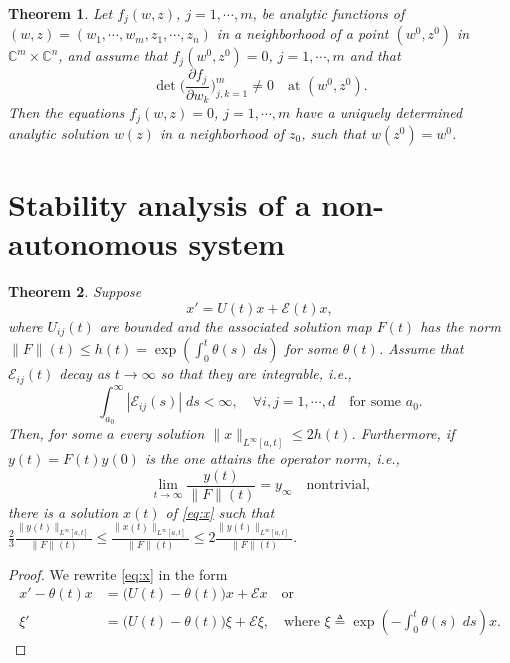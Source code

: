 \documentclass[a4paper,11pt]{article}
\newtheorem{theorem}{Theorem}
\theoremstyle{remark}
\begin{document}
{\begin{theorem}{\cite[p. 24]{L1966}} \label{thm:anal} Let $f_j(w,z)$, $j=1,\cdots,m$, be analytic functions of $(w,z)=(w_1,\cdots,w_m,z_1,\cdots,z_n)$ in a neighborhood of a point $(w^0,z^0)$ in $\mathbb{C}^m\times \mathbb{C}^n$, and assume that $f_j(w^0,z^0)=0$, $j=1,\cdots,m$ and that
$$ \det\Big( \frac{\partial f_j}{\partial w_k} \Big)_{j,k=1}^m \ne 0 \quad \text{at $(w^0,z^0)$}.$$
Then the equations $f_j(w,z)=0$, $j=1,\cdots,m$ have a uniquely determined analytic solution $w(z)$ in a neighborhood of $z_0$, such that $w(z^0)=w^0$.
\end{theorem}



\section{Stability analysis of a non-autonomous system}
\begin{theorem} \label{prop:stab}
 Suppose
 \begin{equation}
x' = U(t)x + \mathcal{E}(t)x, \label{eq:x}
 \end{equation}
where $U_{ij}(t)$ are bounded and the associated solution map $F(t)$ has the norm $\|F\|(t) \le h(t)=\exp\left(\int_0^t \theta(s)\; ds\right)$ for some $\theta(t)$. Assume that $\mathcal{E}_{ij}(t)$ decay as $t \rightarrow \infty$ so that they are integrable, i.e.,
 $$ \int_{a_0}^\infty |\mathcal{E}_{ij}(s)| \; ds < \infty, \quad \forall i,j=1,\cdots,d \quad \text{for some $a_0$.}$$
 Then, for some $a$ every solution $\|x\|_{L^\infty[a,t]} \le 2h(t)$. Furthermore, if $y(t)=F(t)y(0)$ is the one attains the operator norm, i.e.,
 $$ \lim_{t \rightarrow \infty}\frac{y(t)}{\|F\|(t)} = y_\infty \quad \text{nontrivial,}$$
 there is a solution $x(t)$ of \eqref{eq:x} such that $\displaystyle \frac{2}{3}\frac{\|y(t)\|_{L^\infty[a,t]}}{\|F\|(t)}\le\frac{\|x(t)\|_{L^\infty[a,t]}}{\|F\|(t)} \le 2\frac{\|y(t)\|_{L^\infty[a,t]}}{\|F\|(t)}.$
\end{theorem}
\begin{proof}
We rewrite \eqref{eq:x} in the form
 \begin{align*}
  x' - \theta(t)x &= \big(U(t)-\theta(t)\big)x + \mathcal{E}x \quad \text{or}\\
  \xi' &=\big(U(t)-\theta(t)\big)\xi + \mathcal{E}\xi, \quad \text{where $\xi\triangleq \exp\left(-\int_0^t \theta(s)\; ds\right) x$}.
 \end{align*}

\end{proof}}
\end{document}
